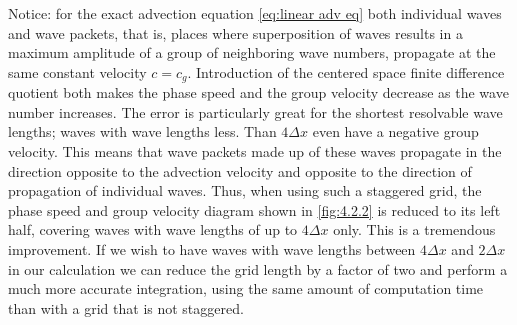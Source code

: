 Notice: for the exact advection equation \ref{eq:linear adv eq} both individual waves and wave packets, that is, places where superposition of waves results in a maximum amplitude of a group of neighboring wave numbers, propagate at the same constant velocity $c=c_g$. Introduction of the centered space finite difference quotient both makes the phase speed and the group velocity decrease as the wave number increases. The error is particularly great for the shortest resolvable wave lengths; waves with wave lengths less. Than $4\Delta x$ even have a negative group velocity. This means that wave packets made up of these waves propagate in the direction opposite to the advection velocity and opposite to the direction of propagation of individual waves.
Thus, when using such a staggered grid, the phase speed and group velocity diagram shown in \ref{fig:4.2.2} is reduced to its left half, covering waves with wave lengths of up to $4\Delta x$ only. This is a tremendous improvement. If we wish to have waves with wave lengths between $4\Delta x$ and $2\Delta x$ in our calculation we can reduce the grid length by a factor of two and perform a much more accurate integration, using the same amount of computation time than with a grid that is not staggered.
